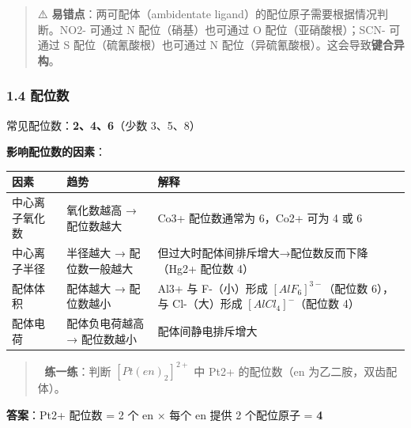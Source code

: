 \documentclass[a4paper,11pt]{ctexart}
\newcounter{none}
\begin{document}
\begin{quote}
⚠️ \textbf{易错点}：两可配体（ambidentate ligand）的配位原子需要根据情况判断。NO2- 可通过 N 配位（硝基）也可通过 O 配位（亚硝酸根）；SCN- 可通过 S 配位（硫氰酸根）也可通过 N 配位（异硫氰酸根）。这会导致\textbf{键合异构}。
\end{quote}

\subsubsection{1.4 配位数}\label{ux914dux4f4dux6570}

常见配位数：\textbf{2、4、6}（少数 3、5、8）

\textbf{影响配位数的因素}：

{\def\LTcaptype{none} %
\begin{longtable}[]{@{}
  >{\raggedright\arraybackslash}p{}
  >{\raggedright\arraybackslash}p{}
  >{\raggedright\arraybackslash}p{}@{}}
\toprule\noalign{}
\begin{minipage}[b]{\linewidth}\raggedright
因素
\end{minipage} & \begin{minipage}[b]{\linewidth}\raggedright
趋势
\end{minipage} & \begin{minipage}[b]{\linewidth}\raggedright
解释
\end{minipage} \\
\midrule\noalign{}
\endhead
\bottomrule\noalign{}
\endlastfoot
中心离子氧化数 & 氧化数越高 → 配位数越大 & Co3+ 配位数通常为 6，Co2+ 可为 4 或 6 \\
中心离子半径 & 半径越大 → 配位数一般越大 & 但过大时配体间排斥增大→配位数反而下降（Hg2+ 配位数 4） \\
配体体积 & 配体越大 → 配位数越小 & Al3+ 与 F-（小）形成 \([AlF_6]^{3-}\)（配位数 6），与 Cl-（大）形成 \([AlCl_4]^-\)（配位数 4） \\
配体电荷 & 配体负电荷越高 → 配位数越小 & 配体间静电排斥增大 \\
\end{longtable}
}

\begin{quote}
📝 \textbf{练一练}：判断 \([Pt(en)_2]^{2+}\) 中 Pt2+ 的配位数（en 为乙二胺，双齿配体）。
\end{quote}

\textbf{答案}：Pt2+ 配位数 = 2 个 en × 每个 en 提供 2 个配位原子 = \textbf{4}
\end{document}
